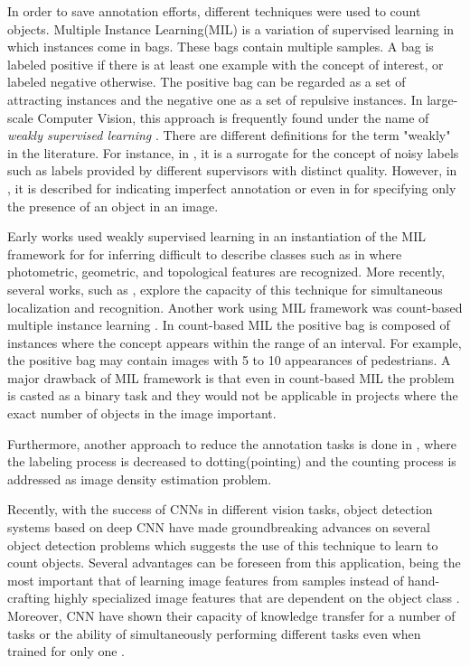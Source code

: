 In order to save annotation efforts, different techniques were used to count objects. Multiple Instance Learning(MIL) \cite{foulds2010review} is a variation of supervised learning in which instances come in bags. These bags contain multiple samples. A bag is labeled positive if there is at least one example with the concept of interest, or labeled negative otherwise. The positive bag can be regarded as a set of attracting instances and the negative one as a set of repulsive instances. In large-scale Computer Vision, this approach is frequently found under the name of \textit{weakly supervised learning} \cite{weber2000unsupervised, fergus2003object}. There are different definitions for the term "weakly" in the literature. For instance, in \cite{dekel2009good}, it is a surrogate for the concept of noisy labels such as labels provided by different supervisors with distinct quality. However, in \cite{raykar2009supervised}, it is described for indicating imperfect annotation or even in \cite{wang2013weakly} for specifying only the presence of an object in an image. 

\indent Early works used weakly supervised learning in an instantiation of the MIL framework for for inferring difficult to describe classes such as in \cite{todorovic2006extracting} where photometric, geometric, and topological features are recognized. More recently, several works, such as \cite{nguyen2009weakly}, explore the capacity of this technique for simultaneous localization and recognition. Another work using MIL framework was count-based multiple instance learning \cite{foulds2010review}. In count-based MIL the positive bag is composed of instances where the concept appears within the range of an interval. For example, the positive bag may contain images with 5 to 10 appearances of pedestrians. A major drawback of MIL framework is that even in count-based MIL the problem is casted as a binary task and they would not be applicable in projects where the exact number of objects in the image important. 

Furthermore, another approach to reduce the annotation tasks is done in \cite{flaccavento2011learning}, where the labeling process is decreased to dotting(pointing) and the counting process is addressed as image density estimation problem.  

Recently, with the success of CNNs in different vision tasks, object detection systems based on deep CNN have made groundbreaking advances on several object detection problems \cite{zhang2015improving, erhan2014scalable, girshick2014rich, he2015spatial, erhan2014scalable} which suggests the use of this technique to learn to count objects. Several advantages can be foreseen from this application, being the most important that of learning image features from samples instead of hand-crafting highly specialized image features that are dependent on the object class \cite{segui2015learning}. Moreover, CNN have shown their capacity of knowledge transfer for a number of tasks or the ability of simultaneously performing different tasks even when trained for only one \cite{zhou2014learning}. 

